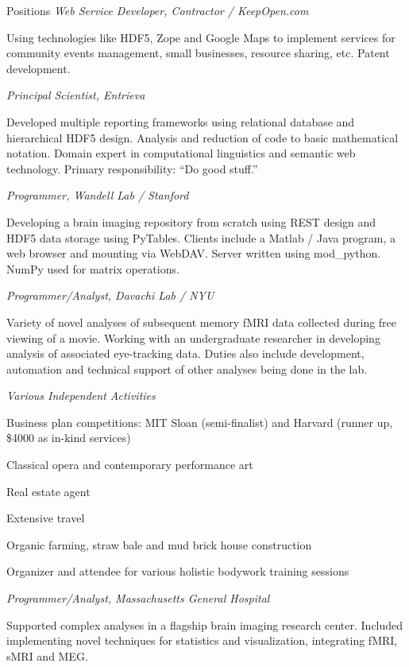 \begin{rubric}{Positions}
\entry*[2004--2013] \emph{Web Service Developer, Contractor / KeepOpen.com}
    \par Using technologies like HDF5, Zope and Google Maps to implement services
    for community events management, small businesses, resource sharing, etc.
    Patent development.

\entry*[2006--2007] \emph{Principal Scientist, Entrieva}
    \par Developed multiple reporting frameworks using relational database and
    hierarchical HDF5 design.  Analysis and reduction of code to basic
    mathematical notation.  Domain expert in computational linguistics and
    semantic web technology.  Primary responsibility: “Do good stuff.”

\entry*[2006] \emph{Programmer, Wandell Lab / Stanford}
    \par Developing a brain imaging repository from scratch using REST design
    and HDF5 data storage using PyTables.  Clients include a Matlab /
    Java program, a web browser and mounting via WebDAV.  Server
    written using mod_python.  NumPy used for matrix operations.

\entry*[2005--2006] \emph{Programmer/Analyst, Davachi Lab / NYU}
    \par Variety of novel analyses of subsequent memory fMRI data collected
    during free viewing of a movie.  Working with an undergraduate researcher in
    developing analysis of associated eye-tracking data.  Duties also include
    development, automation and technical support of other analyses being done
    in the lab.

\entry*[2003--2004] \emph{Various Independent Activities}
\begin{compactitem}
    \item Business plan competitions:  MIT Sloan (semi-finalist) and Harvard
        (runner up, \$4000 as in-kind services)
    \item Classical opera and contemporary performance art
    \item Real estate agent
    \item Extensive travel
    \item Organic farming, straw bale and mud brick house construction
    \item Organizer and attendee for various holistic bodywork training sessions
\end{compactitem}

\entry*[2002] \emph{Programmer/Analyst, Massachusetts General Hospital}
    \par Supported complex analyses in a flagship brain imaging research center.
    Included implementing novel techniques for statistics and visualization,
    integrating fMRI, sMRI and MEG.
\end{rubric}
